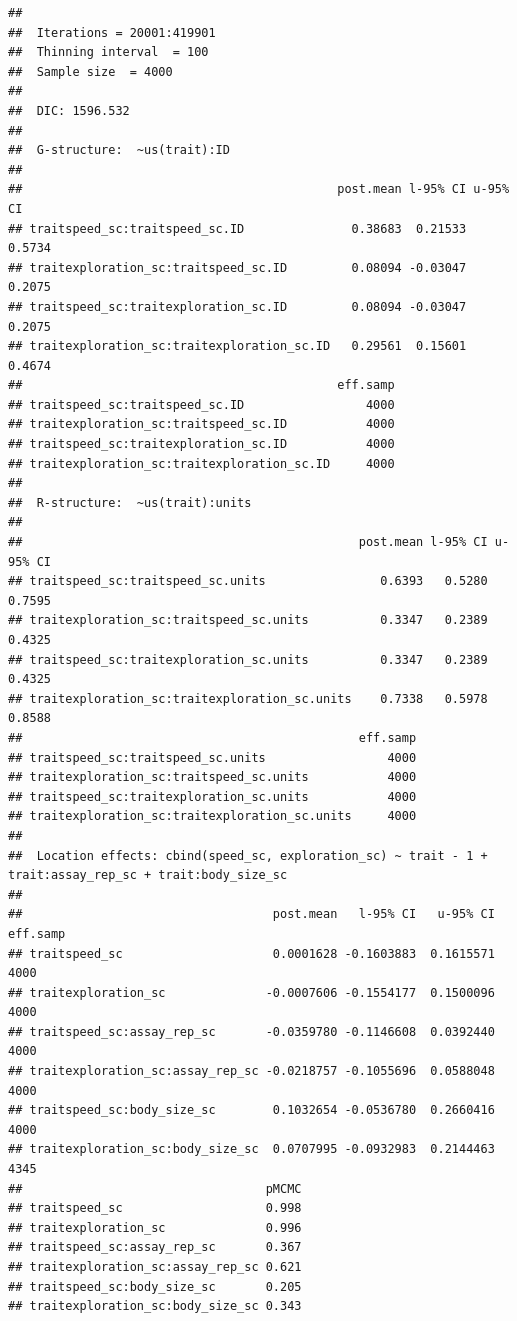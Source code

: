 \documentclass[
  12pt,
]{book}
\begin{document}
\begin{verbatim}
## 
##  Iterations = 20001:419901
##  Thinning interval  = 100
##  Sample size  = 4000 
## 
##  DIC: 1596.532 
## 
##  G-structure:  ~us(trait):ID
## 
##                                            post.mean l-95% CI u-95% CI
## traitspeed_sc:traitspeed_sc.ID               0.38683  0.21533   0.5734
## traitexploration_sc:traitspeed_sc.ID         0.08094 -0.03047   0.2075
## traitspeed_sc:traitexploration_sc.ID         0.08094 -0.03047   0.2075
## traitexploration_sc:traitexploration_sc.ID   0.29561  0.15601   0.4674
##                                            eff.samp
## traitspeed_sc:traitspeed_sc.ID                 4000
## traitexploration_sc:traitspeed_sc.ID           4000
## traitspeed_sc:traitexploration_sc.ID           4000
## traitexploration_sc:traitexploration_sc.ID     4000
## 
##  R-structure:  ~us(trait):units
## 
##                                               post.mean l-95% CI u-95% CI
## traitspeed_sc:traitspeed_sc.units                0.6393   0.5280   0.7595
## traitexploration_sc:traitspeed_sc.units          0.3347   0.2389   0.4325
## traitspeed_sc:traitexploration_sc.units          0.3347   0.2389   0.4325
## traitexploration_sc:traitexploration_sc.units    0.7338   0.5978   0.8588
##                                               eff.samp
## traitspeed_sc:traitspeed_sc.units                 4000
## traitexploration_sc:traitspeed_sc.units           4000
## traitspeed_sc:traitexploration_sc.units           4000
## traitexploration_sc:traitexploration_sc.units     4000
## 
##  Location effects: cbind(speed_sc, exploration_sc) ~ trait - 1 + trait:assay_rep_sc + trait:body_size_sc 
## 
##                                   post.mean   l-95% CI   u-95% CI eff.samp
## traitspeed_sc                     0.0001628 -0.1603883  0.1615571     4000
## traitexploration_sc              -0.0007606 -0.1554177  0.1500096     4000
## traitspeed_sc:assay_rep_sc       -0.0359780 -0.1146608  0.0392440     4000
## traitexploration_sc:assay_rep_sc -0.0218757 -0.1055696  0.0588048     4000
## traitspeed_sc:body_size_sc        0.1032654 -0.0536780  0.2660416     4000
## traitexploration_sc:body_size_sc  0.0707995 -0.0932983  0.2144463     4345
##                                  pMCMC
## traitspeed_sc                    0.998
## traitexploration_sc              0.996
## traitspeed_sc:assay_rep_sc       0.367
## traitexploration_sc:assay_rep_sc 0.621
## traitspeed_sc:body_size_sc       0.205
## traitexploration_sc:body_size_sc 0.343
\end{verbatim}
\end{document}
